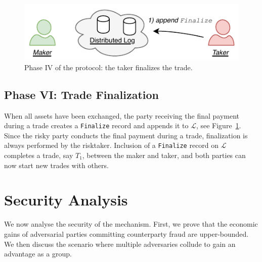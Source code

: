 \begin{figure}[h]
	\centering
	\includegraphics[width=0.7\linewidth]{xchange/assets/xchange_protocol_4}
	\caption{Phase IV of the \ModelName{} protocol: the taker finalizes the trade.}
	\label{fig:xchange_protocol_4}
\end{figure}

\subsection*{Phase VI: Trade Finalization}
\label{sec:phase_finalization}
When all assets have been exchanged, the party receiving the final payment during a trade creates a \texttt{Finalize} record and appends it to $ \mathcal{L} $, see Figure~\ref{fig:xchange_protocol_4}.
Since the risky party conducts the final payment during a trade, finalization is always performed by the risktaker.
Inclusion of a \texttt{Finalize} record on $ \mathcal{L} $ completes a trade, say $ T_1 $, between the maker and taker, and both parties can now start new trades with others.

\section{Security Analysis}
\label{sec:analysis}
We now analyse the security of the \ModelName{} mechanism.
First, we prove that the economic gains of adversarial parties committing counterparty fraud are upper-bounded.
We then discuss the scenario where multiple adversaries collude to gain an advantage as a group.

